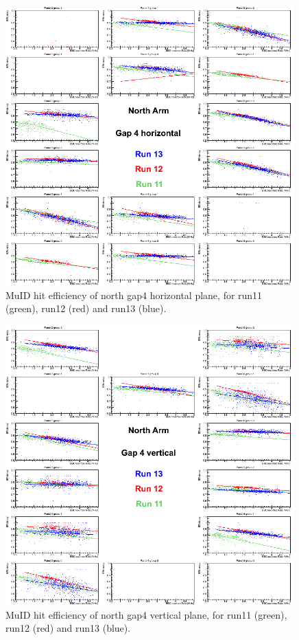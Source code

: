 \begin{center}
  \begin{figure}[p]
    \includegraphics[width=0.99\textwidth]{./figures/efficomp_North_gap4_horizontal.png}
    \caption{\label{Fig:efficiency:MuIdEff:a1g4p0}MuID hit efficiency of north gap4 horizontal plane, for run11 (green), run12 (red) and run13 (blue).}
  \end{figure}
\end{center}
\begin{center}
  \begin{figure}[p]
    \includegraphics[width=0.99\textwidth]{./figures/efficomp_North_gap4_vertical.png}
    \caption{\label{Fig:efficiency:MuIdEff:a1g4p1}MuID hit efficiency of north gap4 vertical plane, for run11 (green), run12 (red) and run13 (blue).}
  \label{fig:muid_last}
  \end{figure}
\end{center}

